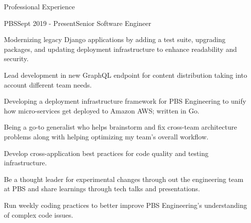 \documentclass{bluefin_cv}
\begin{document}
\begin{bfcvSection}{Professional Experience}

\begin{bfcvWorkSubsection}{PBS}{Sept 2019 - Present}{Senior Software Engineer}
\item Modernizing legacy Django applications by adding a test suite, upgrading packages, and updating deployment infrastructure to enhance readability and security.
\item Lead development in new GraphQL endpoint for content distribution taking into account different team needs.
\item Developing a deployment infrastructure framework for PBS Engineering to unify how micro-services get deployed to Amazon AWS; written in Go.
\item Being a go-to generalist who helps brainstorm and fix cross-team architecture problems along with helping optimizing my team's overall workflow.
\item Develop cross-application best practices for code quality and testing infrastructure.
\item Be a thought leader for experimental changes through out the engineering team at PBS and share learnings through tech talks and presentations.
\item Run weekly coding practices to better improve PBS Engineering's understanding of complex code issues.
\end{bfcvWorkSubsection}


\end{bfcvSection}
\end{document}
